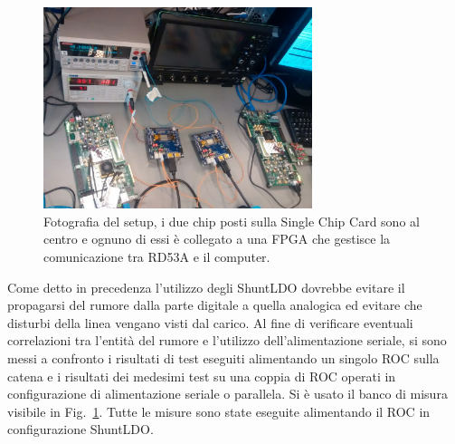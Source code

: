 \begin{figure}
\centering
\includegraphics[width=0.70\textwidth]{Immagini/chipserial}
\caption{Fotografia del setup, i due chip posti sulla Single Chip Card sono al centro e ognuno di essi è collegato a una FPGA che gestisce la comunicazione tra RD53A e il computer.}
\label{chipserial}
\end{figure}
Come detto in precedenza l'utilizzo degli ShuntLDO dovrebbe evitare il propagarsi del rumore dalla parte digitale a quella analogica ed evitare che disturbi della linea vengano visti dal carico. 
Al fine di verificare eventuali correlazioni tra l'entità del rumore e l'utilizzo dell'alimentazione seriale, si sono messi a confronto i risultati di test eseguiti alimentando un singolo ROC sulla catena e i risultati dei medesimi test su una coppia di ROC operati in configurazione di alimentazione seriale o parallela. Si \`e usato il banco di misura visibile in Fig.~\ref{chipserial}. Tutte le misure sono state eseguite alimentando il ROC in configurazione  ShuntLDO.

%
%

